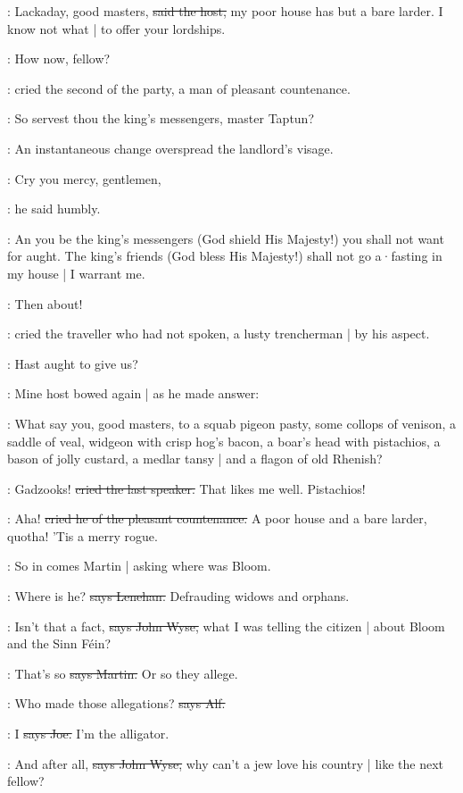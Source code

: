 \terry:
Lackaday,
good masters,
\sout{said the host,}
my poor house has but a bare larder.
I know not what |
to offer your lordships.

\power:
How now,
fellow?

:
cried the second of the party,
a man of pleasant countenance.

\power:
So servest thou the king's messengers,
master Taptun?

:
An instantaneous change overspread the landlord's visage.

\terry:
Cry you mercy,
gentlemen,

:
he said humbly.

\terry:
An you be the king's messengers
(God shield His Majesty!)
you shall not want for aught.
The king's friends
(God bless His Majesty!)
shall not go a·fasting in my house |
I warrant me.

\crofton:
Then about!

:
cried the traveller who had not spoken,
a lusty trencherman |
by his aspect.

\crofton:
Hast aught to give us?

:
Mine host bowed again |
as he made answer:

\terry:
What say you,
good masters,
to a squab pigeon pasty,
some collops of venison,
a saddle of veal,
widgeon with crisp hog's bacon,
a boar's head with pistachios,
a bason of jolly custard,
a medlar tansy |
and a flagon of old Rhenish?

\crofton:
Gadzooks!
\sout{cried the last speaker.}
That likes me well.
Pistachios!

\power:
Aha!
\sout{cried he of the pleasant countenance.}
A poor house and a bare larder,
quotha!
'Tis a merry rogue.

\Nq:
So in comes Martin |
asking where was Bloom.

\lenehan:
Where is he?
\sout{says Lenehan.}
Defrauding widows and orphans.

\johnwyse:
Isn't that a fact,
\sout{says John Wyse,}
what I was telling the citizen |
about Bloom and the Sinn Féin?

\cunningham:
That's so
\sout{says Martin.}
Or so they allege.

\bergan:
Who made those allegations?
\sout{says Alf.}

\joe:
I
\sout{says Joe.}
I'm the alligator.

\johnwyse:
And after all,
\sout{says John Wyse,}
why can't a jew love his country |
like the next fellow?

